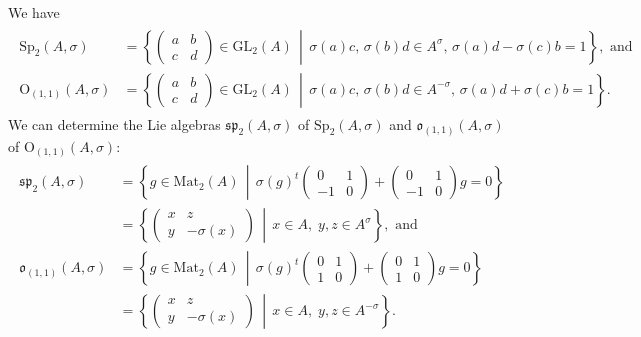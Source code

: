 \documentclass[oneside,11pt]{amsart}
\theoremstyle{definition}
\theoremstyle{remark}
\newcommand{\midwd}{\,\middle\vert\,}
\numberwithin{thm}{section}
\numberwithin{equation}{section}
\begin{document}
We have
\begin{align}\label{eq:groups}
    \begin{aligned}
    \mathrm{Sp}_2(A,\sigma)&=\left\{\begin{pmatrix}
    a & b \\
    c & d
    \end{pmatrix}\in\mathrm{GL}_2(A)\midwd \sigma(a)c,\,\sigma(b)d\in A^\sigma,\,\sigma(a)d-\sigma(c)b=1\right\}, \text{ and }\\[2pt]
    \mathrm{O}_{(1,1)}(A,\sigma)&=\left\{\begin{pmatrix}
    a & b \\
    c & d
    \end{pmatrix}\in \mathrm{GL}_2(A)\midwd \sigma(a)c,\,\sigma(b)d\in A^{-\sigma},\,\sigma(a)d+\sigma(c)b=1\right\}.
    \end{aligned}
\end{align}
We can determine the Lie algebras $\mathfrak{sp}_2(A,\sigma)$ of $\mathrm{Sp}_2(A,\sigma)$ and $\mathfrak o_{(1,1)}(A,\sigma)$ of $\mathrm O_{(1,1)}(A,\sigma)$:
\begin{align}\label{eq:Lie_algebras}
    \begin{aligned}
	    \mathfrak{sp}_2(A,\sigma)& =\left\{g\in \mathrm{Mat}_2(A)\midwd \sigma(g)^t\begin{pmatrix}
        0 & 1 \\
        -1 & 0
      \end{pmatrix}+ \begin{pmatrix}
        0 & 1 \\
        -1 & 0
      \end{pmatrix} g=0\right\}\\
    & =\left\{\begin{pmatrix}
		x & z \\
		y & -\sigma(x)
	\end{pmatrix}\midwd x\in A,\;y,z\in A^\sigma\right\}, \text{ and }\\[2pt]
        \mathfrak o_{(1,1)}(A,\sigma)& =\left\{g\in \mathrm{Mat}_2(A)\midwd \sigma(g)^t\begin{pmatrix}
        0 & 1 \\
        1 & 0
      \end{pmatrix}+ \begin{pmatrix}
        0 & 1 \\
        1 & 0
      \end{pmatrix} g=0\right\}\\
      & =\left\{\begin{pmatrix}
		x & z \\
		y & -\sigma(x)
	\end{pmatrix}\midwd x\in A,\;y,z\in A^{-\sigma}\right\}.
    \end{aligned}
\end{align}
\end{document}
